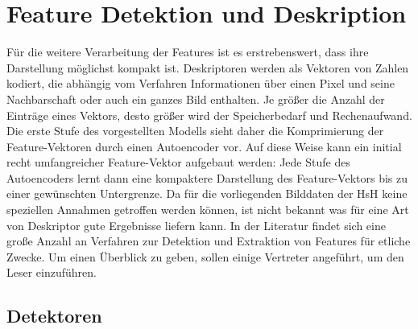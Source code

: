 \section{Feature Detektion und Deskription}
\label{extraction}

Für die weitere Verarbeitung der Features ist es erstrebenswert, dass ihre Darstellung möglichst kompakt ist. Deskriptoren werden als Vektoren von Zahlen kodiert, die abhängig vom Verfahren Informationen über einen Pixel und seine Nachbarschaft oder auch ein ganzes Bild enthalten. Je größer die Anzahl der Einträge eines Vektors, desto größer wird der Speicherbedarf und Rechenaufwand.
Die erste Stufe des vorgestellten Modells sieht daher die Komprimierung der Feature-Vektoren durch einen Autoencoder vor. Auf diese Weise kann ein initial recht umfangreicher Feature-Vektor aufgebaut werden: Jede Stufe des Autoencoders lernt dann eine kompaktere Darstellung des Feature-Vektors bis zu einer gewünschten Untergrenze.\newline
Da für die vorliegenden Bilddaten der HsH keine speziellen Annahmen getroffen werden können, ist nicht bekannt was für eine Art von Deskriptor gute Ergebnisse liefern kann. In der Literatur findet sich eine große Anzahl an Verfahren zur Detektion und Extraktion von Features für etliche Zwecke. Um einen Überblick zu geben, sollen einige Vertreter angeführt, um den Leser einzuführen.

\subsection{Detektoren}


